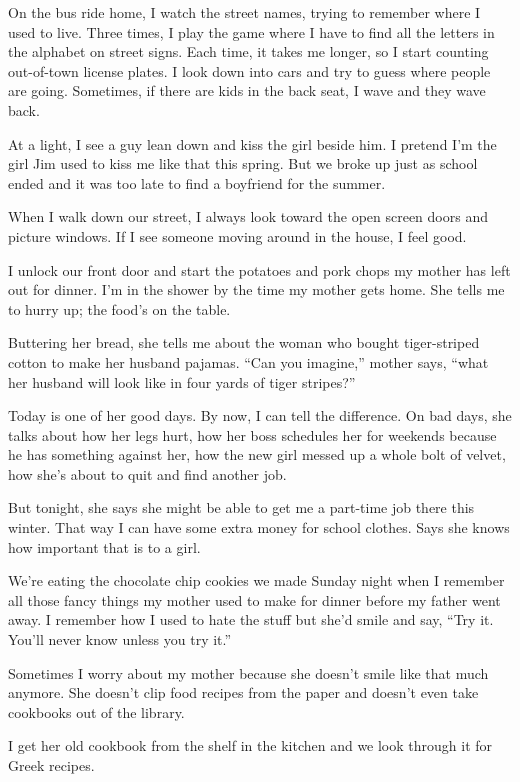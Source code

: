 \documentclass[
]{article}
\begin{document}
On the bus ride home, I watch the street names, trying to remember where
I used to live. Three times, I play the game where I have to find all
the letters in the alphabet on street signs. Each time, it takes me
longer, so I start counting out-of-town license plates. I look down into
cars and try to guess where people are going. Sometimes, if there are
kids in the back seat, I wave and they wave back.

At a light, I see a guy lean down and kiss the girl beside him. I
pretend I'm the girl Jim used to kiss me like that this spring. But we
broke up just as school ended and it was too late to find a boyfriend
for the summer.

When I walk down our street, I always look toward the open screen doors
and picture windows. If I see someone moving around in the house, I feel
good.

I unlock our front door and start the potatoes and pork chops my mother
has left out for dinner. I'm in the shower by the time my mother gets
home. She tells me to hurry up; the food's on the table.

Buttering her bread, she tells me about the woman who bought
tiger-striped cotton to make her husband pajamas. ``Can you imagine,''
mother says, ``what her husband will look like in four yards of tiger
stripes?''

Today is one of her good days. By now, I can tell the difference. On bad
days, she talks about how her legs hurt, how her boss schedules her for
weekends because he has something against her, how the new girl messed
up a whole bolt of velvet, how she's about to quit and find another job.

But tonight, she says she might be able to get me a part-time job there
this winter. That way I can have some extra money for school clothes.
Says she knows how important that is to a girl.

We're eating the chocolate chip cookies we made Sunday night when I
remember all those fancy things my mother used to make for dinner before
my father went away. I remember how I used to hate the stuff but she'd
smile and say, ``Try it. You'll never know unless you try it.''

Sometimes I worry about my mother because she doesn't smile like that
much anymore. She doesn't clip food recipes from the paper and doesn't
even take cookbooks out of the library.

I get her old cookbook from the shelf in the kitchen and we look through
it for Greek recipes.
\end{document}
